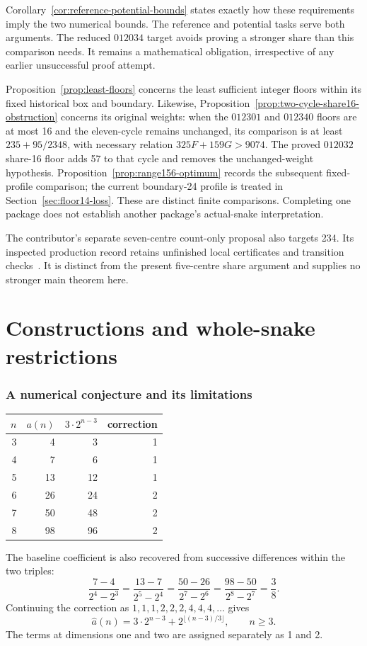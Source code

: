\documentclass[11pt,a4paper]{article}
\theoremstyle{definition}
\theoremstyle{remark}
\begin{document}
Corollary~\ref{cor:reference-potential-bounds} states exactly how these
requirements imply the two numerical bounds. The reference and potential
tasks serve both arguments. The reduced $012034$ target avoids proving a
stronger share than this comparison needs. It remains a mathematical
obligation, irrespective of any earlier unsuccessful proof attempt.

Proposition~\ref{prop:least-floors} concerns the least sufficient integer
floors within its fixed historical box and boundary. Likewise,
Proposition~\ref{prop:two-cycle-share16-obstruction} concerns its original
weights: when the $012301$ and $012340$ floors are at most 16 and the
eleven-cycle remains unchanged, its comparison is at least
$235+95/2348$, with necessary relation $325F+159G>9074$.
The proved $012032$ share-16 floor adds 57 to that cycle and removes
the unchanged-weight hypothesis. Proposition~\ref{prop:range156-optimum}
records the subsequent fixed-profile comparison; the current
boundary-24 profile is treated in Section~\ref{sec:floor14-loss}.
These are distinct finite comparisons. Completing one package does not
establish another package's actual-snake interpretation.

The contributor's separate seven-centre count-only proposal also targets 234.
Its inspected production record retains unfinished local certificates and
transition checks~\cite{conditional234archive}. It is distinct from the present
five-centre share argument and supplies no stronger main theorem here.

\part{Constructions and whole-snake restrictions}
\section{A numerical conjecture and its limitations}\label{sec:hypothesis}
\begin{center}
\begin{tabular}{rrrr}
\toprule
$n$ & $a(n)$ & $3\cdot2^{n-3}$ & correction\\
\midrule
3&4&3&1\\4&7&6&1\\5&13&12&1\\
6&26&24&2\\7&50&48&2\\8&98&96&2\\
\bottomrule
\end{tabular}
\end{center}
The baseline coefficient is also recovered from successive differences within the two triples:
\[
\frac{7-4}{2^4-2^3}=\frac{13-7}{2^5-2^4}
=\frac{50-26}{2^7-2^6}=\frac{98-50}{2^8-2^7}=\frac38.
\]
Continuing the correction as $1,1,1,2,2,2,4,4,4,\ldots$ gives
\begin{equation}\label{eq:model}
\widehat a(n)=3\cdot2^{n-3}+2^{\lfloor(n-3)/3\rfloor},\qquad n\ge3.
\end{equation}
The terms at dimensions one and two are assigned separately as 1 and 2.
\end{document}
